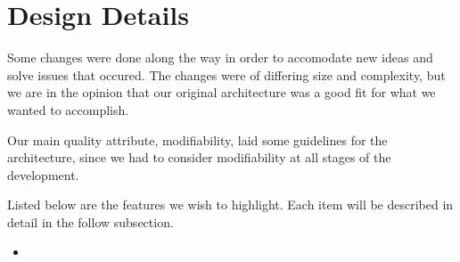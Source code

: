 \section{Design Details}
\label{designdetails}

Some changes were done along the way in order to accomodate new ideas and solve issues that occured. The changes were of differing size and complexity, but we are in the opinion that our original architecture was a good fit for what we wanted to accomplish. 

Our main quality attribute, modifiability, laid some guidelines for the architecture, since we had to consider modifiability at all stages of the development. 

Listed below are the features we wish to highlight.
Each item will be described in detail in the follow subsection.

\begin{itemize}
	\item \textbf{} \\
\end{itemize}
